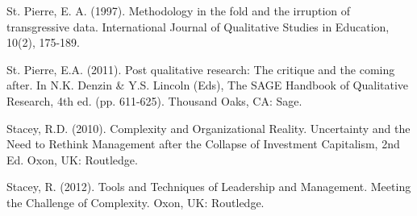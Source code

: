 \begin{thebibliography}{99}
\item St. Pierre, E. A. (1997). Methodology in the fold and the irruption of transgressive data. International Journal of Qualitative Studies in Education, 10(2), 175-189.
\item St. Pierre, E.A. (2011). Post qualitative research: The critique and the coming after. In N.K. Denzin \& Y.S. Lincoln (Eds), The SAGE Handbook of Qualitative Research, 4th ed. (pp. 611-625). Thousand Oaks, CA: Sage. 
\item Stacey, R.D. (2010). Complexity and Organizational Reality. Uncertainty and the Need to Rethink Management after the Collapse of Investment Capitalism, 2nd Ed. Oxon, UK: Routledge. 
\item Stacey, R. (2012). Tools and Techniques of Leadership and Management. Meeting the Challenge of Complexity. Oxon, UK: Routledge.

\end{thebibliography}